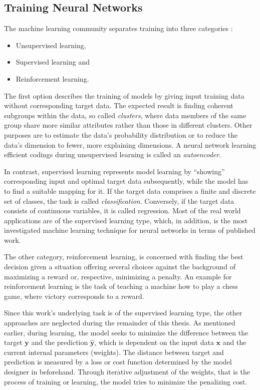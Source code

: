 \subsection{Training Neural Networks}
\label{ssec:training}
The machine learning community separates training into three categories \cite{Bishop2006}:
\begin{itemize}
	\item Unsupervised learning,
	\item Supervised learning and
	\item Reinforcement learning.
\end{itemize}
The first option describes the training of models by giving input training data without corresponding target data.
The expected result is finding coherent subgroups within the data, so called \textit{clusters}, where data members of the same group share more similar attributes rather than those in different clusters.
Other purposes are to estimate the data's probability distribution or to reduce the data's dimension to fewer, more explaining dimensions.
A neural network learning efficient codings during unsupervised learning is called an \textit{autoencoder}.

In contrast, supervised learning represents model learning by ``showing'' corresponding input and optimal target data subsequently, while the model has to find a suitable mapping for it.
If the target data comprises a finite and discrete set of classes, the task is called \textit{classification}.
Conversely, if the target data consists of continuous variables, it is called regression.
Most of the real world applications are of the supervised learning type, which, in addition, is the most investigated machine learning technique for neural networks in terms of published work.

The other category, reinforcement learning, is concerned with finding the best decision given a situation offering several choices against the background of maximizing a reward or, respective, minimizing a penalty.
An example for reinforcement learning is the task of teaching a machine how to play a chess game, where victory corresponds to a reward.

Since this work's underlying task is of the supervised learning type, the other approaches are neglected during the remainder of this thesis.
As mentioned earlier, during learning, the model seeks to minimize the difference between the target $\bm{y}$ and the prediction $\bm{\hat{y}}$, which is dependent on the input data $\bm{x}$ and the current internal parameters (weights).
The distance between target and prediction is measured by a loss or cost function determined by the model designer in beforehand.
Through iterative adjustment of the weights, that is the process of training or learning, the model tries to minimize the penalizing cost.

